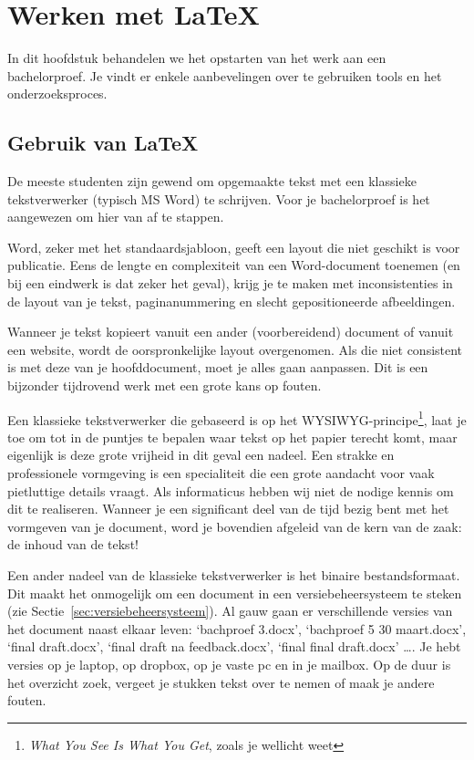 \chapter{Werken met \LaTeX{}}%
\label{ch:voorbereiding}

In dit hoofdstuk behandelen we het opstarten van het werk aan een bachelorproef. Je vindt er enkele aanbevelingen over te gebruiken tools en het onderzoeksproces.

\section{Gebruik van {\LaTeX}}%
\label{sec:gebruik-van-latex}

De meeste studenten zijn gewend om opgemaakte tekst met een klassieke tekstverwerker (typisch MS Word) te schrijven. Voor je bachelorproef is het aangewezen om hier van af te stappen.

Word, zeker met het standaardsjabloon, geeft een layout die niet geschikt is voor publicatie. Eens de lengte en complexiteit van een Word-document toenemen (en bij een eindwerk is dat zeker het geval), krijg je te maken met inconsistenties in de layout van je tekst, paginanummering en slecht gepositioneerde afbeeldingen.

Wanneer je tekst kopieert vanuit een ander (voorbereidend) document of vanuit een website, wordt de oorspronkelijke layout overgenomen. Als die niet consistent is met deze van je hoofddocument, moet je alles gaan aanpassen. Dit is een bijzonder tijdrovend werk met een grote kans op fouten.

Een klassieke tekstverwerker die gebaseerd is op het WYSIWYG-principe\footnote{\emph{What You See Is What You Get}, zoals je wellicht weet}, laat je toe om tot in de puntjes te bepalen waar tekst op het papier terecht komt, maar eigenlijk is deze grote vrijheid in dit geval een nadeel. Een strakke en professionele vormgeving is een specialiteit die een grote aandacht voor vaak pietluttige  details vraagt. Als informaticus hebben wij niet de nodige kennis om dit te realiseren. Wanneer je een significant deel van de tijd bezig bent met het vormgeven van je document, word je bovendien afgeleid van de kern van de zaak: de inhoud van de tekst!

Een ander nadeel van de klassieke tekstverwerker is het binaire bestandsformaat. Dit maakt het onmogelijk om een document in een versiebeheersysteem te steken (zie Sectie~\ref{sec:versiebeheersysteem}). Al gauw gaan er verschillende versies van het document naast elkaar leven: `bachproef 3.docx', `bachproef 5 30 maart.docx', `final draft.docx', `final draft na feedback.docx', `final final draft.docx' \dots. Je hebt versies op je laptop, op dropbox, op je vaste pc en in je mailbox. Op de duur is het overzicht zoek, vergeet je stukken tekst over te nemen of maak je andere fouten.


